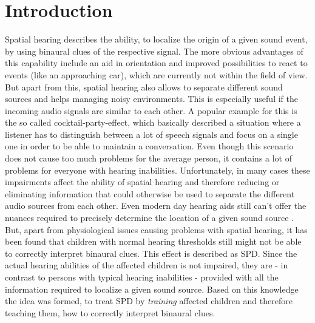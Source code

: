 \documentclass[a4paper,11pt]{article}%
\renewcommand{\\}{\vspace*{0.5\baselineskip} \newline}
\begin{document}
\newpage


\section{Introduction}
\label{sec:introduction}
Spatial hearing describes the ability, to localize the origin of a given sound event, by using binaural clues of the respective signal. The more obvious advantages of this capability include an aid in orientation and improved possibilities to react to events (like an approaching car), which are currently not within the field of view.
\newline
\newline
But apart from this, spatial hearing also allows to separate different sound sources and helps managing noisy environments. This is especially useful if the incoming audio signals are similar to each other. A popular example for this is the so called \dq cocktail-party-effect\dq{}, which basically described a situation where a listener has to distinguish between a lot of speech signals and focus on a single one in order to be able to maintain a conversation.
\newline
\newline
Even though this scenario does not cause too much problems for the average person, it contains a lot of problems for everyone with hearing inabilities. Unfortunately, in many cases these impairments affect the ability of spatial hearing and therefore reducing or eliminating information that could otherwise be used to separate the different audio sources from each other. Even modern day hearing aids still can't offer the nuances required to precisely determine the location of a given sound source \cite{HA-SRT}.
\newline
\newline
But, apart from physiological issues causing problems with spatial hearing, it has been found that children with normal hearing thresholds still might not be able to correctly interpret binaural clues. This effect is described as \ac{SPD}. Since the actual hearing abilities of the affected children is not impaired, they are - in contrast to persons with typical hearing inabilities - provided with all the information required to localize a given sound source. Based on this knowledge the idea was formed, to treat \ac{SPD} by \textit{training} affected children and therefore teaching them, how to correctly interpret binaural clues.
\end{document}
